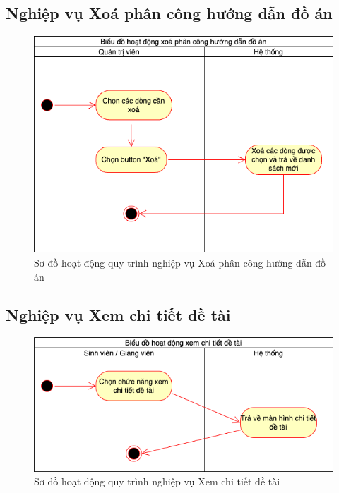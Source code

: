 \documentclass[../Main.tex]{subfiles}
\begin{document}
\subsection{Nghiệp vụ Xoá phân công hướng dẫn đồ án}
\begin{figure}[H]
   \centering
    \includegraphics[width=0.75\linewidth]{Figure/delete_assign.png}
    \caption{Sơ đồ hoạt động quy trình nghiệp vụ Xoá phân công hướng dẫn đồ án}
    \label{fig:delete_assign}
\end{figure}
\newpage
\subsection{Nghiệp vụ Xem chi tiết đề tài}

\begin{figure}[H]
   \centering
    \includegraphics[width=0.75\linewidth]{Figure/detail_topic.png}
    \caption{Sơ đồ hoạt động quy trình nghiệp vụ Xem chi tiết đề tài}
    \label{fig:detail_topic}
\end{figure}
\end{document}
